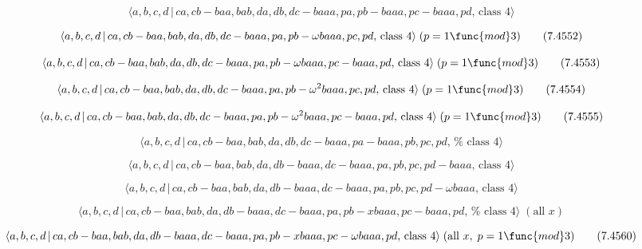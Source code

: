 \documentclass[10pt]{article}
\begin{document}
\begin{equation}
\langle a,b,c,d\,|\,ca,cb-baa,bab,da,db,dc-baaa,pa,pb-baaa,pc-baaa,pd,\,%
\text{class }4\rangle  \tag{7.4551}
\end{equation}

\begin{equation}
\langle a,b,c,d\,|\,ca,cb-baa,bab,da,db,dc-baaa,pa,pb-\omega baaa,pc,pd,\,%
\text{class }4\rangle \;(p=1\func{mod}3)  \tag{7.4552}
\end{equation}

\begin{equation}
\langle a,b,c,d\,|\,ca,cb-baa,bab,da,db,dc-baaa,pa,pb-\omega
baaa,pc-baaa,pd,\,\text{class }4\rangle \;(p=1\func{mod}3)  \tag{7.4553}
\end{equation}

\begin{equation}
\langle a,b,c,d\,|\,ca,cb-baa,bab,da,db,dc-baaa,pa,pb-\omega
^{2}baaa,pc,pd,\,\text{class }4\rangle \;(p=1\func{mod}3)  \tag{7.4554}
\end{equation}

\begin{equation}
\langle a,b,c,d\,|\,ca,cb-baa,bab,da,db,dc-baaa,pa,pb-\omega
^{2}baaa,pc-baaa,pd,\,\text{class }4\rangle \;(p=1\func{mod}3)  \tag{7.4555}
\end{equation}

\begin{equation}
\langle a,b,c,d\,|\,ca,cb-baa,bab,da,db,dc-baaa,pa-baaa,pb,pc,pd,\,\text{%
class }4\rangle  \tag{7.4556}
\end{equation}

\begin{equation}
\langle a,b,c,d\,|\,ca,cb-baa,bab,da,db-baaa,dc-baaa,pa,pb,pc,pd-baaa,\,%
\text{class }4\rangle  \tag{7.4557}
\end{equation}

\begin{equation}
\langle a,b,c,d\,|\,ca,cb-baa,bab,da,db-baaa,dc-baaa,pa,pb,pc,pd-\omega
baaa,\,\text{class }4\rangle  \tag{7.4558}
\end{equation}

\begin{equation}
\langle
a,b,c,d\,|\,ca,cb-baa,bab,da,db-baaa,dc-baaa,pa,pb-xbaaa,pc-baaa,pd,\,\text{%
class }4\rangle \;(\text{all }x)  \tag{7.4559}
\end{equation}

\begin{equation}
\langle a,b,c,d\,|\,ca,cb-baa,bab,da,db-baaa,dc-baaa,pa,pb-xbaaa,pc-\omega
baaa,pd,\,\text{class }4\rangle \;(\text{all }x,\;p=1\func{mod}3) 
\tag{7.4560}
\end{equation}
\end{document}
